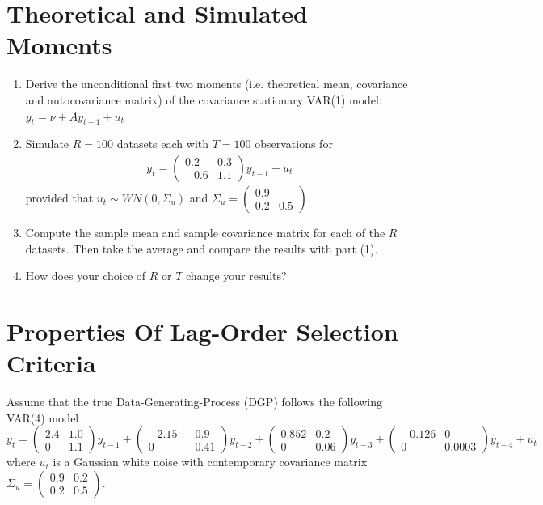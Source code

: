 \documentclass{article}
\begin{document}
	
\section[Theoretical and Simulated Moments]{Theoretical and Simulated Moments\label{ex:TheoreticalAndSimulatedMoments}}
\begin{enumerate}
 	\item Derive the unconditional first two moments (i.e. theoretical mean, covariance and autocovariance matrix) of the covariance stationary VAR(1) model: $y_t = \nu + A y_{t-1} + u_t$
 	\item Simulate $R=100$ datasets each with $T=100$ observations for
 	\begin{align*}
 	y_t = \begin{pmatrix}0.2 &0.3 \\-0.6 & 1.1 \end{pmatrix} y_{t-1}  + u_t
 	\end{align*}
 	provided that $u_t \sim WN(0,\Sigma_u)$ and $\Sigma_u = \begin{pmatrix}0.9 &  \\ 0.2 & 0.5 \end{pmatrix}$.
	\item Compute the sample mean and sample covariance matrix for each of the $R$ datasets. 
	Then take the average and compare the results with part (1).
	\item How does your choice of $R$ or $T$ change your results?
	
\end{enumerate}

\newpage


\section{Properties Of Lag-Order Selection Criteria}
Assume that the true Data-Generating-Process (DGP) follows the following VAR(4) model
$$y_t = \begin{pmatrix}
2.4 & 1.0\\
0 & 1.1
\end{pmatrix}
y_{t-1}+
\begin{pmatrix}
-2.15 & -0.9\\
0 & -0.41
\end{pmatrix}
y_{t-2}+
\begin{pmatrix}
0.852 & 0.2\\
0& 0.06
\end{pmatrix}
y_{t-3}+
\begin{pmatrix}
-0.126 & 0\\
0 & 0.0003
\end{pmatrix}
y_{t-4}
+ u_t$$
where $u_t$ is a Gaussian white noise with contemporary covariance matrix $\Sigma_u = \begin{pmatrix}
0.9&0.2\\0.2&0.5
\end{pmatrix}$.
\end{document}
